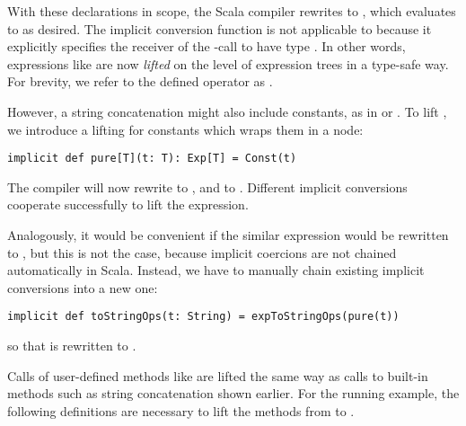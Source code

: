 With these declarations in scope, the Scala compiler rewrites  to
, which evaluates to  as desired.
The implicit conversion function  is not applicable to  because it explicitly specifies the receiver of the \code{+}-call to have type .
In other words, expressions like  are now \emph{lifted} on the level of expression trees in a type-safe way. For brevity, we refer to the defined operator as .

However, a string concatenation might also include constants, as in  or .
To lift , we introduce a lifting for constants which wraps them in a  node:

\begin{lstlisting}
implicit def pure[T](t: T): Exp[T] = Const(t)
\end{lstlisting}

The compiler will now rewrite  to , and
 to .
Different implicit conversions cooperate successfully to lift the expression.

Analogously, it would be convenient if the similar expression  would be rewritten to , but this is not the case, because implicit coercions are not chained automatically in Scala.
Instead, we have to manually chain existing implicit conversions into a new one:
\begin{lstlisting}
implicit def toStringOps(t: String) = expToStringOps(pure(t)) 
\end{lstlisting}
so that  is rewritten to .

Calls of user-defined methods like  are lifted the same way as calls to built-in methods such as string concatenation shown earlier. For the running example, the following definitions are necessary to lift the methods from  to .

